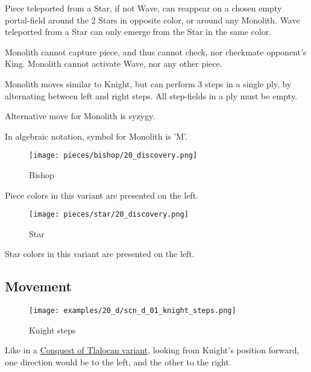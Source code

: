 Piece teleported from a Star, if not Wave, can reappear on a chosen empty
portal-field around the 2 Stars in opposite color, or around any Monolith.
Wave teleported from a Star can only emerge from the Star in the same color.

Monolith cannot capture piece, and thus cannot check, nor checkmate opponent's
King. Monolith cannot activate Wave, nor any other piece.

Monolith moves similar to Knight, but can perform 3 steps in a single ply,
by alternating between left and right steps. All step-fields in a ply must
be empty.

Alternative move for Monolith is syzygy.

In algebraic notation, symbol for Monolith is 'M'.


\noindent
\begin{wrapfigure}[2]{l}{0.4\textwidth}
\centering
\texttt{[image: pieces/bishop/20\_discovery.png]}
\caption{Bishop}
\label{fig:bishop/20_discovery}
\end{wrapfigure}
Piece colors in this variant are presented on the left.

\vspace*{0.30\textheight}
\noindent
\begin{wrapfigure}[2]{l}{0.4\textwidth}
\centering
\texttt{[image: pieces/star/20\_discovery.png]}
\caption{Star}
\label{fig:star/20_discovery}
\end{wrapfigure}
Star colors in this variant are presented on the left.

\clearpage %

\subsection*{Movement}

\vspace*{-0.3\baselineskip}
\noindent
\begin{wrapfigure}[4]{l}{0.35\textwidth}
\centering
\texttt{[image: examples/20\_d/scn\_d\_01\_knight\_steps.png]}
\caption{Knight steps}
\label{fig:scn_d_01_knight_steps}
\end{wrapfigure}
Like in a \hyperref[fig:scn_cot_10_knight_directions]{Conquest of Tlalocan variant},
looking from Knight's position forward, one direction
would be to the left, and the other to the right.

